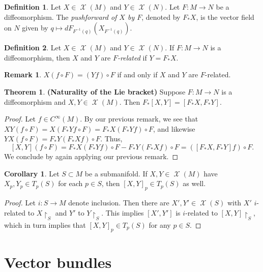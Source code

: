 \documentclass[10pt,letterpaper,cm]{nupset}
\theoremstyle{definition}
\newtheorem*{definition}{Definition}
\newtheorem{remark}{Remark}
\newtheorem{theorem}{Theorem}
\newtheorem{corollary}{Corollary}
\newcommand{\1}{\mathbf{1}}
\newcommand{\0}{\vec 0}
\DeclareMathOperator{\vf}{\mathscr{X}}
\begin{document}
\begin{definition}
Let $X \in \vf(M)$ and $Y \in \vf(N)$. Let $F: M \to N$ be a diffeomorphism. The \textit{pushforward of $X$ by $F$}, denoted by $F_{\ast}X$, is the vector field on $N$ given by $q \mapsto dF_{F^{-1}(q)}(X_{F^{-1}(q)})$.
\end{definition}

\begin{definition}
Let $X \in \vf(M)$ and $Y \in \vf(N)$. If $F: M \to N$ is a diffeomorphism, then $X$ and $Y$ are \textit{$F$-related} if $Y = F_{\ast}X$.
\end{definition}

\begin{remark}
$X(f \circ F) = (Yf) \circ F$ if and only if $X$ and $Y$ are $F$-related.
\end{remark}

\begin{theorem}{\textbf{(Naturality of the Lie bracket)}}
Suppose $F: M \to N$ is a diffeomorphism and $X, Y \in \vf(M)$. Then $F_{\ast}[X, Y] = [F_{\ast}X, F_{\ast}Y]$.
\end{theorem}
\begin{proof}
Let $ f\in C^{\infty}(M)$. By our previous remark, we see that $XY(f \circ F) = X(F_{\ast}Yf \circ F) = F_{\ast}X(F_{\ast}Yf) \circ F$, and likewise $YX(f \circ F) = F_{\ast}Y(F_{\ast}X f) \circ F$. Thus, $$[X, Y](f \circ F) = F_{\ast}X(F_{\ast}Yf) \circ F - F_{\ast}Y(F_{\ast}X f) \circ F = ([F_{\ast}X, F_{\ast}Y] f) \circ F.$$ We conclude by again applying our previous remark.
\end{proof}

\begin{corollary}
Let $S \subset M$ be a submanifold. If $X, Y \in \vf(M)$ have $X_p, Y_p \in T_p(S)$ for each $p\in S$, then $[X, Y]_p \in T_p(S)$ as well.
\end{corollary}
\begin{proof}
Let $i : S \to M$ denote inclusion. Then  there are $X', Y' \in \vf(S)$ with $X'$ $i$-related to $X\restriction_S$ and $Y'$ to $Y\restriction_S$. This implies $[X', Y']$ is $i$-related to $[X, Y]\restriction_S$, which in turn implies that $[X, Y]_p \in T_p(S)$ for any $p\in S$.  
\end{proof}

\section{Vector bundles}
\end{document}
